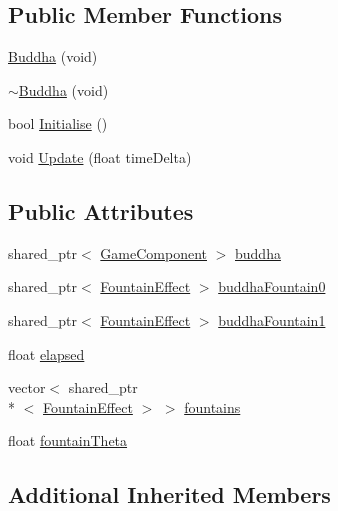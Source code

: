 \subsection*{Public Member Functions}
\begin{DoxyCompactItemize}
\item 
\hyperlink{class_b_g_e_1_1_buddha_a5c52971275b852deedc6dd3f73e54069}{Buddha} (void)
\item 
\hyperlink{class_b_g_e_1_1_buddha_a9592806b6690e54618c115b944011583}{$\sim$\-Buddha} (void)
\item 
bool \hyperlink{class_b_g_e_1_1_buddha_a0b06f27687b1d94374bccec0de47c45c}{Initialise} ()
\item 
void \hyperlink{class_b_g_e_1_1_buddha_a0723abeec23fa78f7d8c830e04c59746}{Update} (float time\-Delta)
\end{DoxyCompactItemize}
\subsection*{Public Attributes}
\begin{DoxyCompactItemize}
\item 
shared\-\_\-ptr$<$ \hyperlink{class_b_g_e_1_1_game_component}{Game\-Component} $>$ \hyperlink{class_b_g_e_1_1_buddha_a03f41c9910ff549ab793a0e27c9ed6b8}{buddha}
\item 
shared\-\_\-ptr$<$ \hyperlink{class_b_g_e_1_1_fountain_effect}{Fountain\-Effect} $>$ \hyperlink{class_b_g_e_1_1_buddha_accce50bbdd57a213a4bc4037d5d0fc63}{buddha\-Fountain0}
\item 
shared\-\_\-ptr$<$ \hyperlink{class_b_g_e_1_1_fountain_effect}{Fountain\-Effect} $>$ \hyperlink{class_b_g_e_1_1_buddha_ad489543277af0eea9477cfd1fc51f688}{buddha\-Fountain1}
\item 
float \hyperlink{class_b_g_e_1_1_buddha_a504991853d9871d15c542797debe7e46}{elapsed}
\item 
vector$<$ shared\-\_\-ptr\\*
$<$ \hyperlink{class_b_g_e_1_1_fountain_effect}{Fountain\-Effect} $>$ $>$ \hyperlink{class_b_g_e_1_1_buddha_a987cf13713d95429d6e2a7d0152fd89f}{fountains}
\item 
float \hyperlink{class_b_g_e_1_1_buddha_a7b87e28db8a5a220a862e7c1e3a27973}{fountain\-Theta}
\end{DoxyCompactItemize}
\subsection*{Additional Inherited Members}


